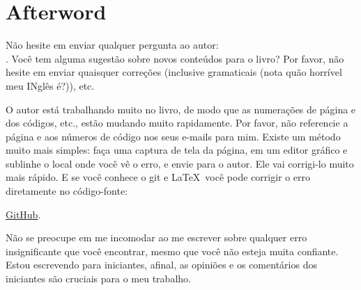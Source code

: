 \part*{Afterword}


Não hesite em enviar qualquer pergunta ao autor: \\
\GTT{\EMAILS}.
Você tem alguma sugestão sobre novos conteúdos para o livro?
Por favor, não hesite em enviar quaisquer correções (inclusive gramaticais (nota quão horrível meu INglês é?)), etc.

O autor está trabalhando muito no livro, de modo que as numerações de página e dos códigos, etc., estão mudando muito rapidamente.
Por favor, não referencie a página e aos números de código nos seus e-mails para mim.
Existe um método muito mais simples: faça uma captura de tela da página, em um editor gráfico e sublinhe o local onde você vê o erro, e envie para o autor. Ele vai corrigi-lo muito mais rápido.
E se você conhece o git e \LaTeX\, você pode corrigir o erro diretamente no código-fonte:

\href{http://go.yurichev.com/17089}{GitHub}.

Não se preocupe em me incomodar ao me escrever sobre qualquer erro insignificante que você encontrar, mesmo que você não esteja muita confiante. Estou escrevendo para iniciantes, afinal, as opiniões e os comentários dos iniciantes são cruciais para o meu trabalho.
